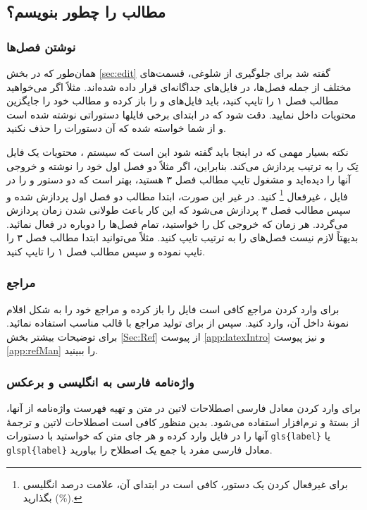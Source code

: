 \subsection[مطالب پایان‌نامه را چطور بنویسم؟]
{مطالب \پ را چطور بنویسم؟}
\subsubsection{نوشتن فصل‌ها}
همان‌طور که در بخش \ref{sec:edit} گفته شد برای جلوگیری از شلوغی، قسمت‌های مختلف \پ از جمله فصل‌ها، در فایل‌های جداگانه‌ای قرار داده شده‌اند. 
مثلاً اگر می‌خواهید مطالب فصل ۱ را تایپ کنید، باید فایل‌های 
و
را باز کرده و مطالب خود را جایگزین محتویات داخل 
نمایید. دقت شود که در ابتدای برخی فایلها دستوراتی نوشته شده است و از شما خواسته شده که آن دستورات را حذف نکنید.


نکته بسیار مهمی که در اینجا باید گفته شود این است که سیستم \lr{\TeX}، محتویات یک فایل تِک را به ترتیب پردازش می‌کند.  بنابراین، اگر مثلاً  دو فصل اول خود را نوشته و خروجی آنها را دیده‌اید و مشغول تایپ مطالب فصل ۳ هستید، بهتر است
که دو دستور 
\verb!!
و
\verb!!
را در فایل 
،
غیرفعال%
\footnote{
برای غیرفعال کردن یک دستور، کافی است در ابتدای آن، علامت درصد انگلیسی (\%) بگذارید.
}
 کنید. در غیر این صورت، ابتدا مطالب دو فصل اول پردازش شده و سپس مطالب فصل ۳ پردازش می‌شود که این کار باعث طولانی شدن زمان پردازش می‌گردد. هر زمان که خروجی کل \پ را خواستید، تمام فصل‌ها را دوباره در
فعال نمائید.
بدیهتاً لازم نیست فصل‌های \پ را به ترتیب تایپ کنید. مثلاً می‌توانید ابتدا مطالب فصل ۳ را تایپ نموده و سپس مطالب فصل ۱ را تایپ کنید. 
\subsubsection{مراجع}
برای وارد کردن مراجع \پ کافی است فایل 
را باز کرده و مراجع خود را به شکل اقلام نمونهٔ داخل آن، وارد کنید.  سپس از  برای تولید مراجع با قالب مناسب استفاده نمائید. برای توضیحات بیشتر بخش \ref{Sec:Ref} از پیوست \ref{app:latexIntro} و نیز پیوست \ref{app:refMan} را ببینید.

\subsubsection{واژه‌نامه فارسی به انگلیسی و برعکس}
برای وارد کردن معادل فارسی اصطلاحات لاتین در متن و تهیه فهرست واژه‌نامه از آنها، از بستهٔ
و نرم‌افزار
استفاده می‌شود. بدین منظور کافی است اصطلاحات لاتین و ترجمهٔ آنها را در فایل
وارد کرده و هر جای متن که خواستید با دستورات
\verb|gls{label}|
یا \verb|glspl{label}|
معادل فارسی مفرد یا جمع یک اصطلاح را بیاورید.

